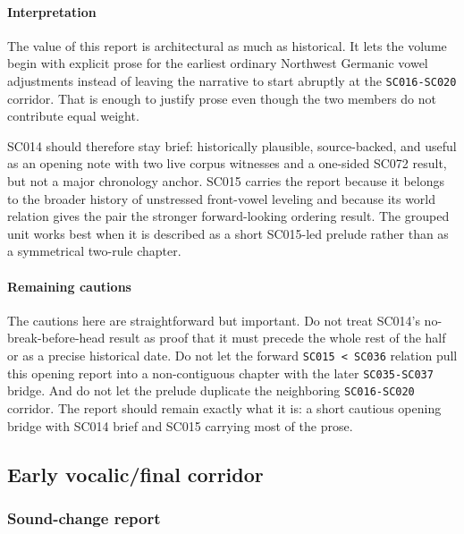 \documentclass[
  british,
  a4paper,
]{article}
\begin{document}
\paragraph{Interpretation}\label{interpretation-11}

The value of this report is architectural as much as historical. It lets
the volume begin with explicit prose for the earliest ordinary Northwest
Germanic vowel adjustments instead of leaving the narrative to start
abruptly at the \texttt{SC016-SC020} corridor. That is enough to justify
prose even though the two members do not contribute equal weight.

SC014 should therefore stay brief: historically plausible,
source-backed, and useful as an opening note with two live corpus
witnesses and a one-sided SC072 result, but not a major chronology
anchor. SC015 carries the report because it belongs to the broader
history of unstressed front-vowel leveling and because its world
relation gives the pair the stronger forward-looking ordering result.
The grouped unit works best when it is described as a short SC015-led
prelude rather than as a symmetrical two-rule chapter.

\paragraph{Remaining cautions}\label{remaining-cautions-11}

The cautions here are straightforward but important. Do not treat
SC014's no-break-before-head result as proof that it must precede the
whole rest of the half or as a precise historical date. Do not let the
forward \texttt{SC015\ \textless{}\ SC036} relation pull this opening
report into a non-contiguous chapter with the later \texttt{SC035-SC037}
bridge. And do not let the prelude duplicate the neighboring
\texttt{SC016-SC020} corridor. The report should remain exactly what it
is: a short cautious opening bridge with SC014 brief and SC015 carrying
most of the prose.

\subsection{Early vocalic/final
corridor}\label{early-vocalicfinal-corridor}

\subsubsection{Sound-change report}\label{sound-change-report-12}
\end{document}
